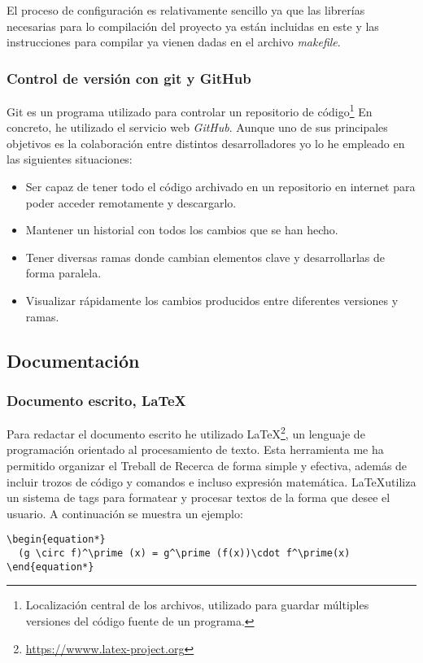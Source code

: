 El proceso de configuración es relativamente sencillo ya que las librerías necesarias para lo compilación del proyecto ya están incluidas en este y las instrucciones para compilar ya vienen dadas en el archivo \textit{makefile}.

\subsubsection{Control de versión con git y GitHub}
Git es un programa utilizado para controlar un repositorio de código\footnote{Localización central de los archivos, utilizado para guardar múltiples versiones del código fuente de un programa.} En concreto, he utilizado el servicio web \textit{GitHub}. Aunque uno de sus principales objetivos es la colaboración entre distintos desarrolladores yo lo he empleado en las siguientes situaciones:
\begin{itemize}
\item{Ser capaz de tener todo el código archivado en un repositorio en internet para poder acceder remotamente y descargarlo.}
\item{Mantener un historial con todos los cambios que se han hecho.}
\item{Tener diversas ramas donde cambian elementos clave y desarrollarlas de forma paralela.}
\item{Visualizar rápidamente los cambios producidos entre diferentes versiones y ramas.}
\end{itemize}
\newpage 
\subsection{Documentación}
\subsubsection{Documento escrito, \LaTeX}
Para redactar el documento escrito he utilizado \LaTeX \footnote{\url{https://wwww.latex-project.org}}, un lenguaje de programación orientado al procesamiento de texto. Esta herramienta me ha permitido organizar el Treball de Recerca de forma simple y efectiva, además de incluir trozos de código y comandos e incluso expresión matemática. \LaTeX utiliza un sistema de tags para formatear y procesar textos de la forma que desee el usuario. A continuación se muestra un ejemplo:
\begin{lstlisting}
\begin{equation*}
  (g \circ f)^\prime (x) = g^\prime (f(x))\cdot f^\prime(x)
\end{equation*}  
\end{lstlisting}

